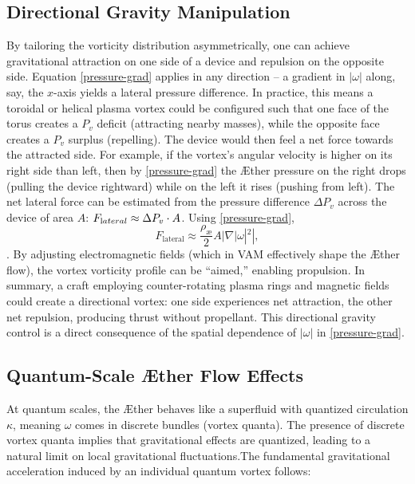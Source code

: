 \subsection*{Directional Gravity Manipulation}
By tailoring the vorticity distribution asymmetrically, one can achieve gravitational attraction on one side of a device and repulsion on the opposite side. Equation \eqref{pressure-grad} applies in any direction – a gradient in $|\omega|$ along, say, the $x$-axis yields a lateral pressure difference. In practice, this means a toroidal or helical plasma vortex could be configured such that one face of the torus creates a $P_v$ deficit (attracting nearby masses), while the opposite face creates a $P_v$ surplus (repelling). The device would then feel a net force towards the attracted side. For example, if the vortex’s angular velocity is higher on its right side than left, then by \eqref{pressure-grad} the Æther pressure on the right drops (pulling the device rightward) while on the left it rises (pushing from left). The net lateral force can be estimated from the pressure difference $\Delta P_v$ across the device of area $A$: $F_{\textrm lateral}\approx \Delta P_v \cdot A$. Using \eqref{pressure-grad},
\begin{equation}
    F_{\text{lateral}} \approx \frac{\rho_{\text{\ae}}}{2} A |\nabla |\omega|^2|,
    \label{eq:lateral_force}
\end{equation}
. By adjusting electromagnetic fields (which in VAM effectively shape the Æther flow), the vortex vorticity profile can be “aimed,” enabling propulsion. In summary, a craft employing counter-rotating plasma rings and magnetic fields could create a directional vortex: one side experiences net attraction, the other net repulsion, producing thrust without propellant. This directional gravity control is a direct consequence of the spatial dependence of $|\omega|$ in \eqref{pressure-grad}.

\subsection*{Quantum-Scale Æther Flow Effects}
At quantum scales, the Æther behaves like a superfluid with quantized circulation $\kappa$, meaning $\omega$ comes in discrete bundles (vortex quanta). The presence of discrete vortex quanta implies that gravitational effects are quantized, leading to a natural limit on local gravitational fluctuations.The fundamental gravitational acceleration induced by an individual quantum vortex follows:

